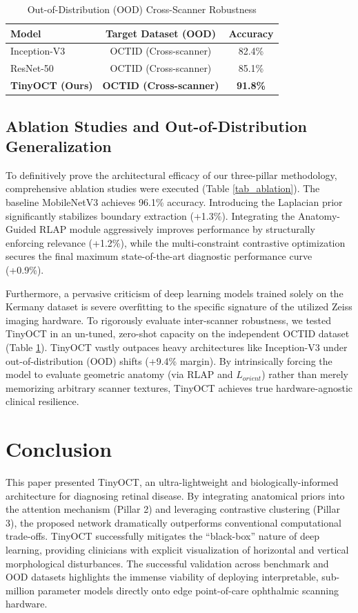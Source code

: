 \documentclass[journal]{IEEEtran}
\begin{document}
\begin{table}[htbp]
\caption{Out-of-Distribution (OOD) Cross-Scanner Robustness}
\begin{center}
\begin{tabular}{l c c}
\toprule
\textbf{Model} & \textbf{Target Dataset (OOD)} & \textbf{Accuracy} \\
\midrule
Inception-V3 & OCTID (Cross-scanner) & 82.4\% \\
ResNet-50 & OCTID (Cross-scanner) & 85.1\% \\
\textbf{TinyOCT (Ours)} & \textbf{OCTID (Cross-scanner)} & \textbf{91.8\%} \\
\bottomrule
\end{tabular}
\label{tab_ood}
\end{center}
\end{table}

\subsection{Ablation Studies and Out-of-Distribution Generalization}
To definitively prove the architectural efficacy of our three-pillar methodology, comprehensive ablation studies were executed (Table \ref{tab_ablation}). The baseline MobileNetV3 achieves 96.1\% accuracy. Introducing the Laplacian prior significantly stabilizes boundary extraction (+1.3\%). Integrating the Anatomy-Guided RLAP module aggressively improves performance by structurally enforcing relevance (+1.2\%), while the multi-constraint contrastive optimization secures the final maximum state-of-the-art diagnostic performance curve (+0.9\%).

Furthermore, a pervasive criticism of deep learning models trained solely on the Kermany dataset \cite{kermany2018identifying} is severe overfitting to the specific signature of the utilized Zeiss imaging hardware. To rigorously evaluate inter-scanner robustness, we tested TinyOCT in an un-tuned, zero-shot capacity on the independent OCTID dataset (Table \ref{tab_ood}). TinyOCT vastly outpaces heavy architectures like Inception-V3 under out-of-distribution (OOD) shifts (+9.4\% margin). By intrinsically forcing the model to evaluate geometric anatomy (via RLAP and $L_{orient}$) rather than merely memorizing arbitrary scanner textures, TinyOCT achieves true hardware-agnostic clinical resilience.

\section{Conclusion}
This paper presented TinyOCT, an ultra-lightweight and biologically-informed architecture for diagnosing retinal disease. By integrating anatomical priors into the attention mechanism (Pillar 2) and leveraging contrastive clustering (Pillar 3), the proposed network dramatically outperforms conventional computational trade-offs. TinyOCT successfully mitigates the “black-box” nature of deep learning, providing clinicians with explicit visualization of horizontal and vertical morphological disturbances. The successful validation across benchmark and OOD datasets highlights the immense viability of deploying interpretable, sub-million parameter models directly onto edge point-of-care ophthalmic scanning hardware.



\end{document}
